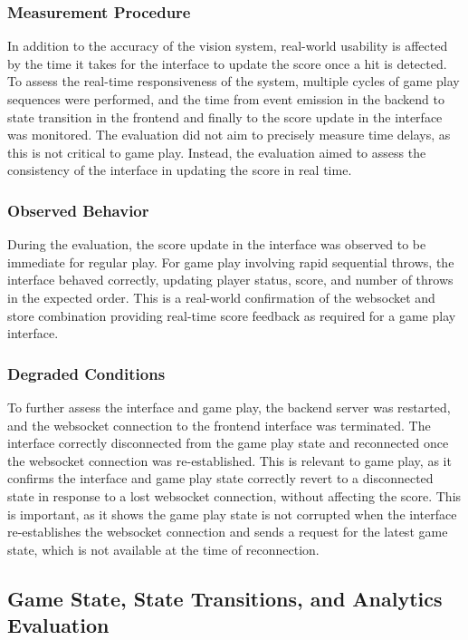 \subsubsection{Measurement Procedure}
In addition to the accuracy of the vision system, real-world usability is affected by the time it takes for the interface to update the score once a hit is detected. To assess the real-time responsiveness of the system, multiple cycles of game play sequences were performed, and the time from event emission in the backend to state transition in the frontend and finally to the score update in the interface was monitored. The evaluation did not aim to precisely measure time delays, as this is not critical to game play. Instead, the evaluation aimed to assess the consistency of the interface in updating the score in real time.

\subsubsection{Observed Behavior}
During the evaluation, the score update in the interface was observed to be immediate for regular play. For game play involving rapid sequential throws, the interface behaved correctly, updating player status, score, and number of throws in the expected order. This is a real-world confirmation of the websocket and store combination providing real-time score feedback as required for a game play interface.

\subsubsection{Degraded Conditions}
To further assess the interface and game play, the backend server was restarted, and the websocket connection to the frontend interface was terminated. The interface correctly disconnected from the game play state and reconnected once the websocket connection was re-established. This is relevant to game play, as it confirms the interface and game play state correctly revert to a disconnected state in response to a lost websocket connection, without affecting the score. This is important, as it shows the game play state is not corrupted when the interface re-establishes the websocket connection and sends a request for the latest game state, which is not available at the time of reconnection.

\subsection{Game State, State Transitions, and Analytics Evaluation}
